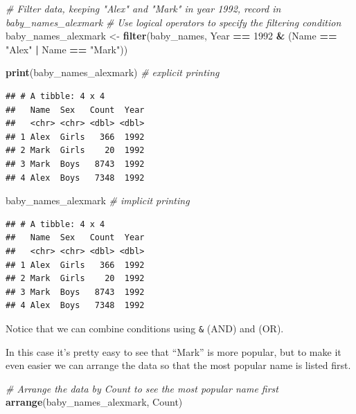 \documentclass[]{book}
\newenvironment{Shaded}{\begin{snugshade}}{\end{snugshade}}
\newcommand{\CommentTok}[1]{\textcolor[rgb]{0.56,0.35,0.01}{\textit{#1}}}
\newcommand{\DecValTok}[1]{\textcolor[rgb]{0.00,0.00,0.81}{#1}}
\newcommand{\KeywordTok}[1]{\textcolor[rgb]{0.13,0.29,0.53}{\textbf{#1}}}
\newcommand{\NormalTok}[1]{#1}
\newcommand{\OperatorTok}[1]{\textcolor[rgb]{0.81,0.36,0.00}{\textbf{#1}}}
\newcommand{\StringTok}[1]{\textcolor[rgb]{0.31,0.60,0.02}{#1}}
\begin{document}
\begin{Shaded}
\begin{Highlighting}[]
\CommentTok{# Filter data, keeping "Alex" and "Mark" in year 1992, record in baby_names_alexmark}
\CommentTok{# Use logical operators to specify the filtering condition}
\NormalTok{baby_names_alexmark <-}\StringTok{ }\KeywordTok{filter}\NormalTok{(baby_names, }
\NormalTok{             Year }\OperatorTok{==}\StringTok{ }\DecValTok{1992} \OperatorTok{&}\StringTok{ }\NormalTok{(Name }\OperatorTok{==}\StringTok{ "Alex"} \OperatorTok{|}\StringTok{ }\NormalTok{Name }\OperatorTok{==}\StringTok{ "Mark"}\NormalTok{))}

\KeywordTok{print}\NormalTok{(baby_names_alexmark) }\CommentTok{# explicit printing}
\end{Highlighting}
\end{Shaded}

\begin{verbatim}
## # A tibble: 4 x 4
##   Name  Sex   Count  Year
##   <chr> <chr> <dbl> <dbl>
## 1 Alex  Girls   366  1992
## 2 Mark  Girls    20  1992
## 3 Mark  Boys   8743  1992
## 4 Alex  Boys   7348  1992
\end{verbatim}

\begin{Shaded}
\begin{Highlighting}[]
\NormalTok{baby_names_alexmark }\CommentTok{# implicit printing}
\end{Highlighting}
\end{Shaded}

\begin{verbatim}
## # A tibble: 4 x 4
##   Name  Sex   Count  Year
##   <chr> <chr> <dbl> <dbl>
## 1 Alex  Girls   366  1992
## 2 Mark  Girls    20  1992
## 3 Mark  Boys   8743  1992
## 4 Alex  Boys   7348  1992
\end{verbatim}

Notice that we can combine conditions using \texttt{\&} (AND)
and \texttt{\textbar{}} (OR).

In this case it's pretty easy to see that ``Mark'' is more popular,
but to make it even easier we can arrange the data so that the
most popular name is listed first.

\begin{Shaded}
\begin{Highlighting}[]
\CommentTok{# Arrange the data by Count to see the most popular name first}
\KeywordTok{arrange}\NormalTok{(baby_names_alexmark, Count)}
\end{Highlighting}
\end{Shaded}
\end{document}
